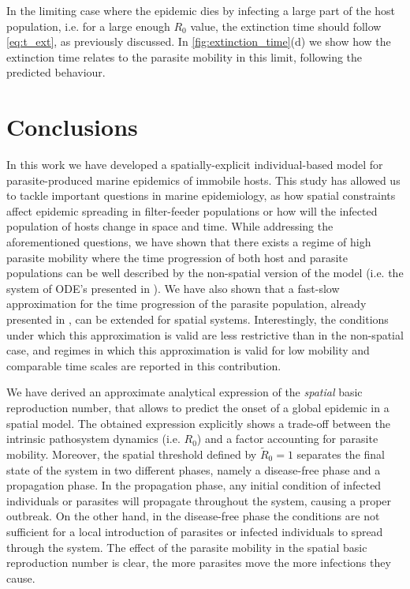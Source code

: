 In the limiting case where the epidemic dies by infecting a large part of
the host population, i.e. for a large enough $R_0$ value, the extinction time
should follow \cref{eq:t_ext}, as previously discussed. In
\cref{fig:extinction_time}(d) we show how the extinction time relates to the
parasite mobility in this limit, following the predicted behaviour.

\section{Conclusions} \label{sec: conclusions}

In this work we have developed a spatially-explicit individual-based model
for parasite-produced marine epidemics of immobile hosts. This study has
allowed us to tackle important questions in marine epidemiology, as how spatial
constraints affect epidemic spreading in filter-feeder populations or how will
the infected population of hosts change in space and time. While addressing the
aforementioned questions, we have shown that there exists a regime of high
parasite mobility where the time progression of both host and parasite
populations can be well described by the non-spatial version of the model (i.e.
the system of ODE's presented in \cite{GimenezRomero2021}). We have also shown
that a fast-slow approximation for the time progression of the parasite
population, already presented in \cite{GimenezRomero2021}, can be extended for
spatial systems. Interestingly, the conditions under which this approximation
is valid  are less restrictive than in the non-spatial case, and regimes in
which this approximation is valid for low mobility and comparable time scales
are reported in this contribution.

We have derived an approximate analytical expression of the
\textit{spatial} basic reproduction number, that allows to predict the onset of
a global epidemic in a spatial model. The obtained expression explicitly shows
a trade-off between the intrinsic pathosystem dynamics (i.e. $R_0$) and a
factor accounting for parasite mobility. Moreover, the spatial threshold
defined by $\tilde{R}_0=1$ separates the final state of the system in two
different phases, namely a disease-free phase and a propagation phase. In the
propagation phase, any initial condition of infected individuals or parasites
will propagate throughout the system, causing a proper outbreak. On the other
hand, in the disease-free phase the conditions are not sufficient for a local
introduction of parasites or infected individuals to spread through the system.
The effect of the parasite mobility in the spatial basic reproduction number is
clear, the more parasites move the more infections they cause.

